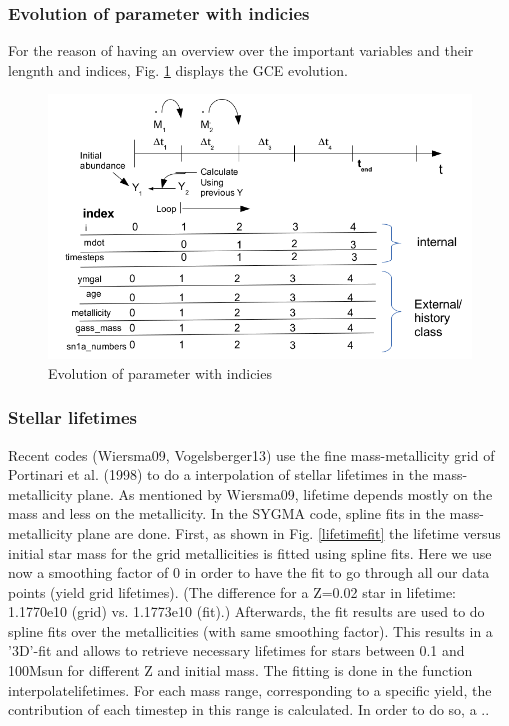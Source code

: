 
\subsubsection{Evolution of parameter with indicies}

For the reason of having an overview over the important
variables and their lengnth and indices, Fig. \ref{idxchart}
displays the GCE evolution.


\begin{figure}
\includegraphics[width=154mm]{figures/evol_index_chart.png}
\caption{Evolution of parameter with indicies}
\label{idxchart}
\end{figure}


\subsubsection{Stellar lifetimes}

Recent codes (Wiersma09, Vogelsberger13)
use the  fine mass-metallicity grid of
Portinari et al. (1998) to do a interpolation
of stellar lifetimes in the mass-metallicity plane.
As mentioned by Wiersma09, lifetime depends mostly
on the mass and less on the metallicity.
In the SYGMA code, spline fits in the mass-metallicity
plane are done. First, as shown in Fig. \ref{lifetimefit}
the lifetime versus initial star mass for the grid metallicities is fitted
using spline fits. Here we use now a smoothing factor of 0 in order
to have the fit to go through all our data points (yield grid lifetimes).
(The difference for a Z=0.02 star in lifetime: 1.1770e10 (grid) vs. 1.1773e10 (fit).)
Afterwards, the fit results are used to do spline
fits over the metallicities (with same smoothing factor). This results in a '3D'-fit and
allows to retrieve necessary lifetimes for stars between
0.1 and 100Msun for different Z and initial mass.
The fitting is done in the function 
interpolate\textunderscore lifetimes.
For each mass range, corresponding to a specific yield,
the contribution of each timestep in this range is calculated.
In order to do so, a ..

